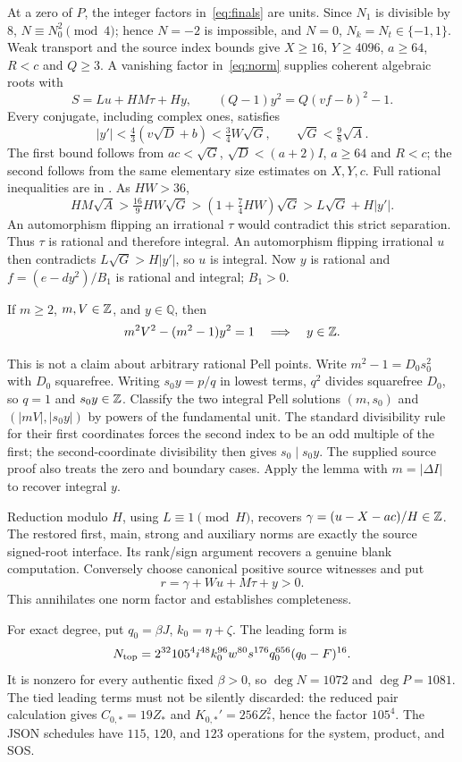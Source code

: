\documentclass[11pt]{article}
\newcommand{\file}[1]{\texttt{\detokenize{#1}}}
\begin{document}
At a zero of $P$, the integer factors in~\eqref{eq:finals} are units.
Since $N_1$ is divisible by $8$, $N\equiv N_0^2\pmod4$; hence $N=-2$ is
impossible, and $N=0$, $N_k=N_t\in\{-1,1\}$. Weak transport and the source
index bounds give $X\ge16$, $Y\ge4096$, $a\ge64$, $R<c$ and $Q\ge3$.
A vanishing factor in~\eqref{eq:norm} supplies coherent algebraic roots with
\[
 S=Lu+HM\tau+Hy,\qquad
 (Q-1)y^2=Q(vf-b)^2-1.
\]
Every conjugate, including complex ones, satisfies
\[
 |y'|<\tfrac43(v\sqrt D+b)<\tfrac34W\sqrt G,
 \qquad \sqrt G<\tfrac98\sqrt A.
\tag{4}
\]
The first bound follows from $ac<\sqrt G$, $\sqrt D<(a+2)I$, $a\ge64$
and $R<c$; the second follows from the same elementary size estimates on
$X,Y,c$. Full rational inequalities are in \file{norms/TWO_WEIGHT_PROOF.md}.
As $HW>36$,
\[
 HM\sqrt A>\tfrac{16}{9}HW\sqrt G
   >(1+\tfrac74HW)\sqrt G>L\sqrt G+H|y'|.
\]
An automorphism flipping an irrational $\tau$ would contradict this strict
separation. Thus $\tau$ is rational and therefore integral. An automorphism
flipping irrational $u$ then contradicts $L\sqrt G>H|y'|$, so $u$ is integral.
Now $y$ is rational and $f=(e-dy^2)/B_1$ is rational and integral; $B_1>0$.

\begin{lemma}
If $m\ge2$, $m,V\in\mathbb Z$, and $y\in\mathbb Q$, then
\[
 m^2V^2-(m^2-1)y^2=1\quad\Longrightarrow\quad y\in\mathbb Z.
\]
\end{lemma}
This is not a claim about arbitrary rational Pell points. Write
$m^2-1=D_0s_0^2$ with $D_0$ squarefree. Writing $s_0y=p/q$ in lowest terms, $q^2$ divides squarefree $D_0$, so
$q=1$ and $s_0y\in\mathbb Z$. Classify the two integral Pell solutions
$(m,s_0)$ and $(|mV|,|s_0y|)$ by powers of the fundamental unit. The standard
divisibility rule for their first coordinates forces the second index to
be an odd multiple of the first; the second-coordinate divisibility then
gives $s_0\mid s_0y$. The supplied source proof also treats the zero and
boundary cases. Apply the lemma with $m=|\Delta I|$ to recover integral $y$.

Reduction modulo $H$, using $L\equiv1\pmod H$, recovers
$\gamma=(u-X-ac)/H\in\mathbb Z$. The restored first, main, strong and auxiliary
norms are exactly the source signed-root interface. Its rank/sign argument
recovers a genuine blank computation. Conversely choose canonical positive
source witnesses and put
\[
 r=\gamma+Wu+M\tau+y>0.
\]
This annihilates one norm factor and establishes completeness.

For exact degree, put $q_0=\beta J$, $k_0=\eta+\zeta$. The leading form is
\[
 N_{\rm top}=2^{32}105^4 i^{48}k_0^{96}w^{80}s^{176}
 q_0^{656}(q_0-F)^{16}.
\]
It is nonzero for every authentic fixed $\beta>0$, so $\deg N=1072$ and
$\deg P=1081$. The tied leading terms must not be silently discarded:
the reduced pair calculation gives $C_{0,*}=19Z_*$ and
$K_{0,*}'=256Z_*^2$, hence the factor $105^4$. The JSON schedules have
$115$, $120$, and $123$ operations for the system, product, and SOS.
\end{document}
